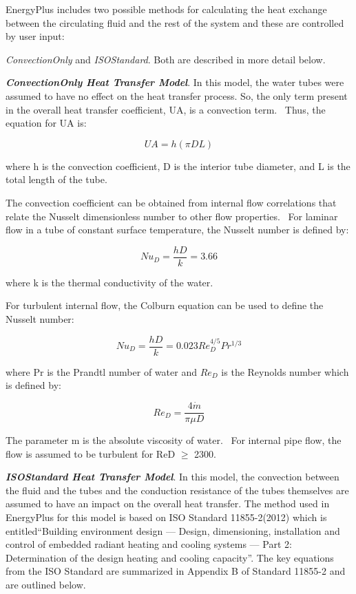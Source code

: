 EnergyPlus includes two possible methods for calculating the heat exchange between the circulating fluid and the rest of the system and these are controlled by user input: {\emph{ConvectionOnly} and \emph{ISOStandard}.  Both are described in more detail below.

\textbf{\emph{ConvectionOnly Heat Transfer Model}}.  In this model, the water tubes were assumed to have no effect on the heat transfer process.  So, the only term present in the overall heat transfer coefficient, UA, is a convection term.~ Thus, the equation for UA is:

\begin{equation}
UA = h\left( {\pi DL} \right)
\end{equation}

where h is the convection coefficient, D is the interior tube diameter, and L is the total length of the tube.

The convection coefficient can be obtained from internal flow correlations that relate the Nusselt dimensionless number to other flow properties.~ For laminar flow in a tube of constant surface temperature, the Nusselt number is defined by:

\begin{equation}
N{u_D} = \frac{{hD}}{k} = 3.66
\end{equation}

where k is the thermal conductivity of the water.

For turbulent internal flow, the Colburn equation can be used to define the Nusselt number:

\begin{equation}
N{u_D} = \frac{{hD}}{k} = 0.023{Re_D^{4/5}}{Pr^{1/3}}
\end{equation}

where Pr is the Prandtl number of water and \(Re_D\) is the Reynolds number which is defined by:

\begin{equation}
{Re_D} = \frac{{4\dot m}}{{\pi \mu D}}
\label{eq:RadSysHXReD681}
\end{equation}

The parameter m is the absolute viscosity of water.~ For internal pipe flow, the flow is assumed to be turbulent for ReD \(\geq\) 2300.

\textbf{\emph{ISOStandard Heat Transfer Model}}.  In this model, the convection between the fluid and the tubes and the conduction resistance of the tubes themselves are assumed to have an impact on the overall heat transfer.  The method used in EnergyPlus for this model is based on ISO Standard 11855-2(2012) which is entitled``Building environment design — Design, dimensioning, installation and control of embedded radiant heating and cooling systems — Part 2: Determination of the design heating and cooling capacity''.  The key equations from the ISO Standard are summarized in Appendix B of Standard 11855-2 and are outlined below.

}
